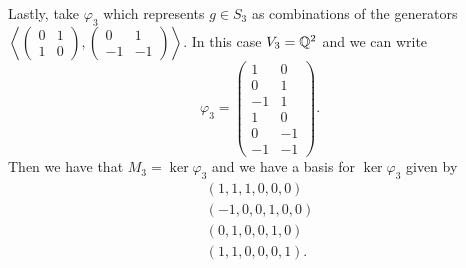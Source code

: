 \documentclass[leqno]{article}
\begin{document}
\begin{solution}
\begin{enumerate}[(a)]
    Lastly, take $\varphi_3$ which represents $g\in S_3$ as combinations of the generators $\left\langle \begin{pmatrix} 0 & 1 \\ 1 & 0 \end{pmatrix}, \begin{pmatrix} 0 & 1 \\ -1 & -1 \end{pmatrix}\right\rangle$.  In this case $V_3=\mathbb{Q}^2$ and we can write
    \[
    \varphi_3 = \begin{pmatrix} 1 & 0 \\ 0 & 1 \\ -1 & 1 \\ 1 & 0 \\ 0 & -1 \\ -1 & -1 \end{pmatrix}.
    \]
    Then we have that $M_3=\ker \varphi_3$ and we have a basis for $\ker \varphi_3$ given by
    \begin{align*}
        (1,1,1,0,0,0)\\
        (-1,0,0,1,0,0)\\
        (0,1,0,0,1,0)\\
        (1,1,0,0,0,1).
    \end{align*}
\end{enumerate}
\end{solution}
\end{document}
